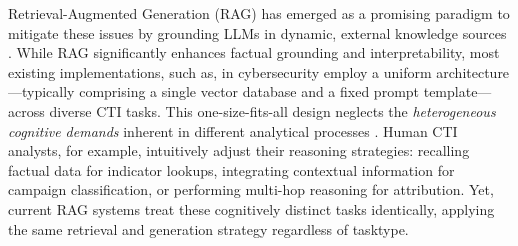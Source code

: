 \documentclass[5p,times,authoryear]{elsarticle}
\begin{document}




Retrieval-Augmented Generation (RAG) has emerged as a promising paradigm to mitigate these issues by grounding LLMs in dynamic, external knowledge sources \citep{lewis2020rag,karpukhin2020dense}. While RAG significantly enhances factual grounding and interpretability, most existing implementations, such as\citep{mitra2024localintel,fayyazi2024ttp,borah2025adapting}, in cybersecurity employ a uniform architecture—typically comprising a single vector database and a fixed prompt template—across diverse CTI tasks. This one-size-fits-all design neglects the \textit{heterogeneous cognitive demands} inherent in different analytical processes \citep{nvd2024,mitre2024cwe,shi2023distracted}. Human CTI analysts, for example, intuitively adjust their reasoning strategies: recalling factual data for indicator lookups, integrating contextual information for campaign classification, or performing multi-hop reasoning for attribution. Yet, current RAG systems treat these cognitively distinct tasks identically, applying the same retrieval and generation strategy regardless of tasktype.
\end{document}
